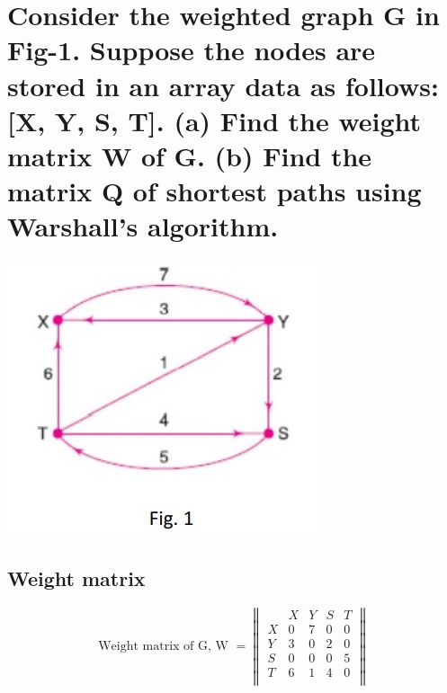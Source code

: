 \documentclass[11 pt]{article}
\begin{document}
\pagebreak

\section{Consider the weighted graph G in Fig-1. Suppose the nodes are stored in an array data as follows: [X, Y, S, T]. (a) Find the weight matrix W of G. (b) Find the matrix Q of shortest paths using Warshall's algorithm.}
\justify
{
\begin{center}
	\includegraphics[scale=0.6]{Pictures/Screenshot_2.jpg} 
\end{center}
}
\subsection{Weight matrix}
$$
\textrm{Weight matrix of G, W }=
\begin{Vmatrix}
	  & X & Y & S & T\\
	X & 0 & 7 & 0 & 0 \\
	Y & 3 & 0 & 2 & 0 \\
	S & 0 & 0 & 0 & 5 \\
	T & 6 & 1 & 4 & 0 \\
\end{Vmatrix}
$$
	
\end{document}
